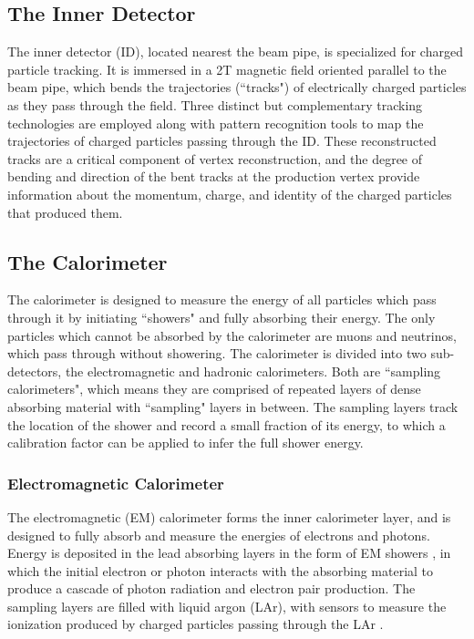 \documentclass[12pt]{article}
\begin{document}
\subsection{The Inner Detector}

The inner detector (ID), located nearest the beam pipe, is specialized for charged particle tracking. It is immersed in a 2T magnetic field oriented parallel to the beam pipe, which bends the trajectories (``tracks") of electrically charged particles as they pass through the field. Three distinct but complementary tracking technologies are employed along with pattern recognition tools to map the trajectories of charged particles passing through the ID. These reconstructed tracks are a critical component of vertex reconstruction, and the degree of bending and direction of the bent tracks at the production vertex provide information about the momentum, charge, and identity of the charged particles that produced them. 

\subsection{The Calorimeter}

The calorimeter is designed to measure the energy of all particles which pass through it by initiating ``showers" and fully absorbing their energy. The only particles which cannot be absorbed by the calorimeter are muons and neutrinos, which pass through without showering. The calorimeter is divided into two sub-detectors, the electromagnetic and hadronic calorimeters. Both are ``sampling calorimeters", which means they are comprised of repeated layers of dense absorbing material with ``sampling" layers in between. The sampling layers track the location of the shower and record a small fraction of its energy, to which a calibration factor can be applied to infer the full shower energy. 

\subsubsection{Electromagnetic Calorimeter}

The electromagnetic (EM) calorimeter forms the inner calorimeter layer, and is designed to fully absorb and measure the energies of electrons and photons. Energy is deposited in the lead absorbing layers in the form of EM showers \cite{em_showers}, in which the initial electron or photon interacts with the absorbing material to produce a cascade of photon radiation and electron pair production. The sampling layers are filled with liquid argon (LAr), with sensors to measure the ionization produced by charged particles passing through the LAr \cite{em_cal}. 
\end{document}
